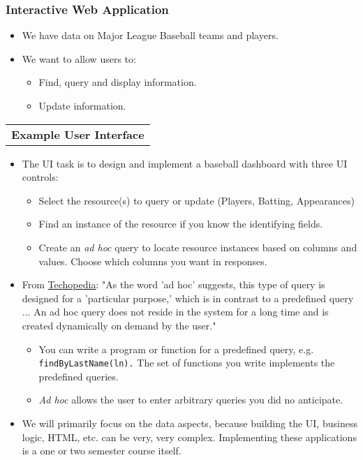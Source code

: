 \documentclass[11pt]{article}
\providecommand{\tightlist}{%
      \setlength{\itemsep}{0pt}\setlength{\parskip}{0pt}}
\begin{document}
    \subsubsection{Interactive Web
Application}\label{interactive-web-application}

\begin{itemize}
\item
  We have data on Major League Baseball teams and players.
\item
  We want to allow users to:

  \begin{itemize}
  \tightlist
  \item
    Find, query and display information.
  \item
    Update information.
  \end{itemize}
\end{itemize}

\begin{longtable}[]{@{}c@{}}
\toprule
\tabularnewline
\midrule
\endhead
\textbf{Example User Interface}\tabularnewline
\bottomrule
\end{longtable}

\begin{itemize}
\tightlist
\item
  The UI task is to design and implement a baseball dashboard with three
  UI controls:

  \begin{itemize}
  \tightlist
  \item
    Select the resource(s) to query or update (Players, Batting,
    Appearances)
  \item
    Find an instance of the resource if you know the identifying fields.
  \item
    Create an \emph{ad hoc} query to locate resource instances based on
    columns and values. Choose which columns you want in responses.
  \end{itemize}
\item
  From
  \href{https://www.techopedia.com/definition/30581/ad-hoc-query-sql-programming}{Techopedia}:
  "As the word 'ad hoc' suggests, this type of query is designed for a
  'particular purpose,' which is in contrast to a predefined query ...
  An ad hoc query does not reside in the system for a long time and is
  created dynamically on demand by the user."

  \begin{itemize}
  \tightlist
  \item
    You can write a program or function for a predefined query, e.g.
    \texttt{findByLastName(ln).} The set of functions you write
    implements the predefined queries.
  \item
    \emph{Ad hoc} allows the user to enter arbitrary queries you did no
    anticipate.
  \end{itemize}
\item
  We will primarily focus on the data aspects, because building the UI,
  business logic, HTML, etc. can be very, very complex. Implementing
  these applications is a one or two semester course itself.
\end{itemize}
\end{document}
